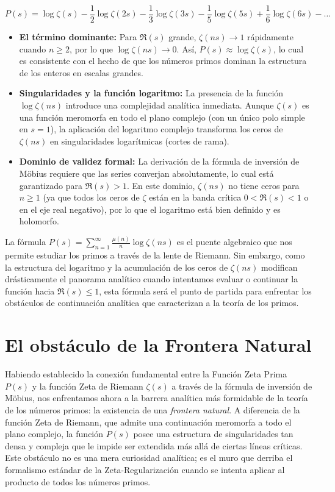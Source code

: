 $$ P(s) = \log \zeta(s) - \frac{1}{2}\log \zeta(2s) - \frac{1}{3}\log \zeta(3s) - \frac{1}{5}\log \zeta(5s) + \frac{1}{6}\log \zeta(6s) - \dots $$

\begin{itemize}
    \item \textbf{El término dominante:} Para $\Re(s)$ grande, $\zeta(ns) \to 1$ rápidamente cuando $n \ge 2$, por lo que $\log \zeta(ns) \to 0$. Así, $P(s) \approx \log \zeta(s)$, lo cual es consistente con el hecho de que los números primos dominan la estructura de los enteros en escalas grandes.
    \item \textbf{Singularidades y la función logaritmo:} La presencia de la función $\log \zeta(ns)$ introduce una complejidad analítica inmediata. Aunque $\zeta(s)$ es una función meromorfa en todo el plano complejo (con un único polo simple en $s=1$), la aplicación del logaritmo complejo transforma los ceros de $\zeta(ns)$ en singularidades logarítmicas (cortes de rama). 
    \item \textbf{Dominio de validez formal:} La derivación de la fórmula de inversión de Möbius requiere que las series converjan absolutamente, lo cual está garantizado para $\Re(s) > 1$. En este dominio, $\zeta(ns)$ no tiene ceros para $n \ge 1$ (ya que todos los ceros de $\zeta$ están en la banda crítica $0 < \Re(s) < 1$ o en el eje real negativo), por lo que el logaritmo está bien definido y es holomorfo.
\end{itemize}

La fórmula $P(s) = \sum_{n=1}^{\infty} \frac{\mu(n)}{n} \log \zeta(ns)$ es el puente algebraico que nos permite estudiar los primos a través de la lente de Riemann. Sin embargo, como la estructura del logaritmo y la acumulación de los ceros de $\zeta(ns)$ modifican drásticamente el panorama analítico cuando intentamos evaluar o continuar la función hacia $\Re(s) \le 1$, esta fórmula será el punto de partida para enfrentar los obstáculos de continuación analítica que caracterizan a la teoría de los primos.

\section{El obstáculo de la Frontera Natural}

Habiendo establecido la conexión fundamental entre la Función Zeta Prima $P(s)$ y la función Zeta de Riemann $\zeta(s)$ a través de la fórmula de inversión de Möbius, nos enfrentamos ahora a la barrera analítica más formidable de la teoría de los números primos: la existencia de una \textit{frontera natural}. A diferencia de la función Zeta de Riemann, que admite una continuación meromorfa a todo el plano complejo, la función $P(s)$ posee una estructura de singularidades tan densa y compleja que le impide ser extendida más allá de ciertas líneas críticas. Este obstáculo no es una mera curiosidad analítica; es el muro que derriba el formalismo estándar de la Zeta-Regularización cuando se intenta aplicar al producto de todos los números primos.

